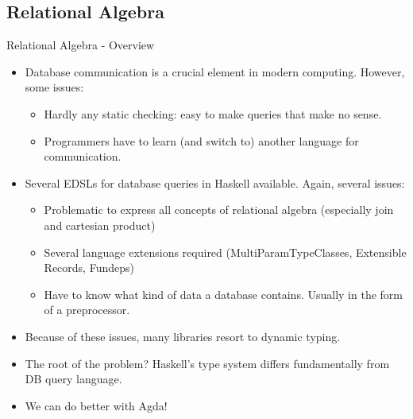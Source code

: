 \documentclass[10pt]{beamer}
\begin{document}
\subsection{Relational Algebra}
\begin{frame}[fragile]{Relational Algebra - Overview}

\begin{itemize}
\item Database communication is a crucial element in modern computing. However, some issues:
	\begin{itemize}
	\item Hardly any static checking: easy to make queries that make no sense.
	\item Programmers have to learn (and switch to) another language for communication.
	\end{itemize}
\item Several EDSLs for database queries in Haskell available. Again, several issues:
	\begin{itemize}
	\item Problematic to express all concepts of relational algebra (especially join and cartesian product)
	\item Several language extensions required (MultiParamTypeClasses, Extensible Records, Fundeps)
	\item Have to know what kind of data a database contains. Usually in the form of a preprocessor.
	\end{itemize}
\item Because of these issues, many libraries resort to dynamic typing.
\item The root of the problem? Haskell's type system differs fundamentally from DB query language.
\item We can do better with Agda!
\end{itemize}

\end{frame}
\end{document}
